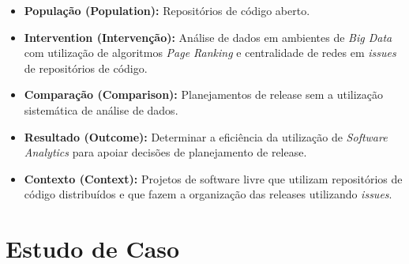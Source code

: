 \begin{itemize}
    \item \textbf{População (Population):} Repositórios de código aberto.
    \item \textbf{Intervention (Intervenção):} Análise de dados em ambientes de
        \textit{Big Data} com utilização de algoritmos \textit{Page Ranking} e
        centralidade de redes em \textit{issues} de repositórios de código.
    \item \textbf{Comparação (Comparison):} Planejamentos de release sem a utilização
        sistemática de análise de dados.
    \item \textbf{Resultado  (Outcome):} Determinar a eficiência da utilização de
        \textit{Software Analytics} para apoiar decisões de planejamento de release.
    \item \textbf{Contexto (Context):} Projetos de software livre que utilizam
        repositórios de código distribuídos e que fazem a organização das releases
        utilizando \textit{issues}.
\end{itemize}

\section{Estudo de Caso}

